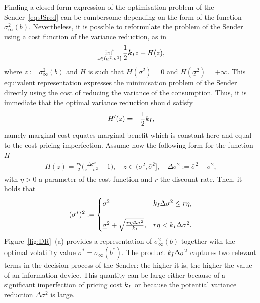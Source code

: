 \documentclass[a4paper,10pt]{article}
\theoremstyle{definition}
\theoremstyle{plain}
\numberwithin{equation}{section}
\begin{document}
\medskip


Finding a closed-form expression of the optimisation problem of the Sender~\eqref{eq:JSred} can be cumbersome depending on the form of the function $\sigma^2_\infty(b)$. Nevertheless, it is possible to reformulate the problem of the Sender using a cost function of the variance reduction, as in
\begin{align*}
 \inf_{z \in (\underline\sigma^2, \bar\sigma^2]}    \frac12 k_{\rm I} z  + H(z), 
\end{align*}
where $z := \sigma^2_\infty(b)$ and $H$ is such that $H(\bar\sigma^2) =0$ and $H(\underline\sigma^2) = +\infty$. This equivalent representation expresses the minimisation problem of the Sender directly using the cost of reducing the variance of the consumption. Thus, it is immediate that the optimal variance reduction should satisfy 
\begin{align*}
H'(z) = - \frac12 k_{\rm I},
\end{align*}
namely marginal cost equates marginal benefit which is constant here and equal to the cost pricing imperfection. Assume now the following form for the function $H$
\begin{align*}
H(z) = 
\frac{r \eta}{2}  \Big(\frac{\Delta\sigma^2}{z - \underline\sigma^2}-1\Big), \quad z \in (\underline\sigma^2, \bar\sigma^2], \quad \Delta\sigma^2 := \bar\sigma^2 - \underline\sigma^2,
\end{align*}
with $\eta>0$ a parameter of the cost function and $r$ the discount rate.  Then, it holds that
\begin{align*}
(\sigma^\ast)^2 := 
	\begin{cases}
	\bar\sigma^2 & k_{\rm I} \Delta\sigma^2 \leq  r \eta , \\
	& \\
	\underline\sigma^2 + \sqrt{\frac{r\eta \Delta\sigma^2}{k_{\rm I}}}, &   r \eta < k_{\rm I} \Delta\sigma^2.
	\end{cases}
\end{align*}
Figure~\ref{fig:DR}~(a) provides a representation of $\sigma^2_\infty(b)$ together with the optimal volatility value $\sigma^\ast = \sigma_\infty(b^\ast)$. The product $k_{\rm I} \Delta\sigma^2$ captures two relevant terms in the decision process of the Sender: the higher it is, the higher the value of an information device. This quantity can be large either because of a significant imperfection of pricing cost $k_{\rm I}$ or because the potential variance reduction $\Delta\sigma^2$ is large.
 
 \medskip
\end{document}
